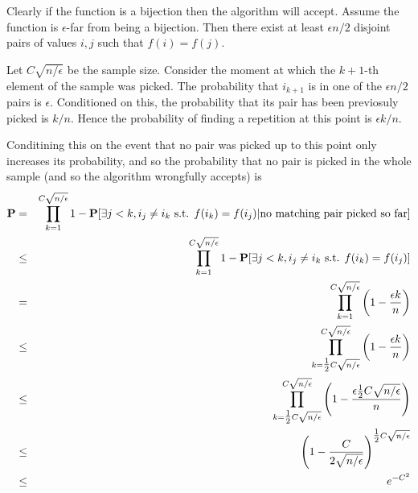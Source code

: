 \documentclass[11pt]{article} \usepackage{amssymb}
\newcommand{\half}{{\textstyle \frac12}}
\begin{document}
\begin{enumerate}
  Clearly if the function is a bijection then the algorithm will accept.
  Assume the function is $\epsilon$-far from being a bijection. Then there exist
  at least $\epsilon n/2$ disjoint pairs of values $i,j$ such that
  $f(i)=f(j)$. 

  Let $C\sqrt{n/\epsilon}$ be the sample size.
  Consider the moment at which the $k+1$-th element of the sample was picked.
  The probability that $i_{k+1}$ is in one of the $\epsilon n/2$ pairs is 
  $\epsilon$. Conditioned on this, the probability that its pair has been
  previosuly picked is $k/n$. Hence the probability of finding a repetition 
  at this point is $\epsilon k/n$. 
  
  Conditining this on the event that no pair
  was picked up to this point only increases its probability, and so the 
  probability that no pair
  is picked in the whole sample (and so the algorithm wrongfully accepts) is
  \begin{eqnarray*}
  \P &=& \prod_{k=1}^{C\sqrt{n/\epsilon}}1-\P[\mbox{$\exists j<k, i_j\neq i_k$ s.t. $f(i_k)=f(i_j)$}|\mbox{no matching pair picked so far}]
  \\ &\leq& \prod_{k=1}^{C\sqrt{n/\epsilon}}1-\P[\mbox{$\exists j<k, i_j\neq i_k$ s.t. $f(i_k)=f(i_j)$}]
  \\ &=&\prod_{k=1}^{C\sqrt{n/\epsilon}}\left(1-{\epsilon k\over n}\right)  
  \\ &\leq&\prod_{k=\half C\sqrt{n/\epsilon}}^{C\sqrt{n/\epsilon}}\left(1-{\epsilon k\over n}\right)  
  \\ &\leq& \prod_{k=\half C\sqrt{n/\epsilon}}^{C\sqrt{n/\epsilon}}\left(1-{\epsilon \half C\sqrt{n/\epsilon}\over n}\right)  
  \\ &\leq& \left(1-{C\over 2\sqrt{n/\epsilon}}\right)^{\half C\sqrt{n/\epsilon}}  
  \\ &\leq& e^{-C^2}
  \end{eqnarray*}

\end{enumerate}
\end{document}
